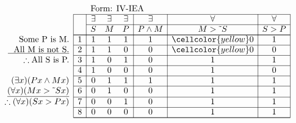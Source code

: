 \documentclass[10pt,legalpaper,landscape,cmtt]{article}
\begin{document}
{\begin{minipage}[t]{3.25in}
	\(
	\begin{array}{r|c|ccc|c|c|c|}
		\multicolumn{2}{c}{}&\multicolumn{6}{l}{\mbox{Form: IV-IEA}} \\ \cline{2-8}
		\hspace{1in}	&	& \exists & \exists & \exists & \exists & \forall & \forall\\ \cline{3-8}
		&	& S & M & P &  P \wedge M  &  M > \tilde~S  &  S > P \\ \cline{2-8} \cline{2-8}
		\phantom{\therefore}\mbox{Some P is M.}   & 1 & 1 & 1 & 1 &   1   &   \cellcolor{yellow} 0   &   1  \\ \cline{2-8}
		\underline{\phantom{\therefore}\mbox{All M is not S.}}   & 2 & 1 & 1 & 0 &   0   &   \cellcolor{yellow} 0   &   0  \\ \cline{2-8}
		\therefore \mbox{All S is P.}   & 3 & 1 & 0 & 1 &   0   &   1   &   1  \\ \cline{2-8}
		& 4 & 1 & 0 & 0 &   0   &   1   &   0  \\ \cline{2-8}
		(\exists x)(Px \wedge Mx)   & 5 & 0 & 1 & 1 &   1   &   1   &   1  \\ \cline{2-8}
		\underline{(\forall x)(Mx > \tilde~Sx)}   & 6 & 0 & 1 & 0 &   0   &   1   &   1  \\ \cline{2-8}
		\therefore(\forall x)(Sx > Px)   & 7 & 0 & 0 & 1 &   0   &   1   &   1  \\ \cline{2-8}
		& 8 & 0 & 0 & 0 &   0   &   1   &   1   \\ \cline{2-8}\cline{2-8} 
	\end{array}
	\)
\end{minipage}

}
\end{document}
